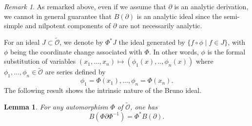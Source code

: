 \documentclass[10pt,twoside,reqno]{amsart}
\newtheorem{lemma}[thm]{Lemma}
\theoremstyle{remark}
\theoremstyle{remark}
\newtheorem{remark}[thm]{Remark}
\newcommand{\tO}{\widetilde{\mathcal{O}}}
\begin{document}
\begin{remark}\label{remark-Bnotnecanalytic}
  As remarked above, even if we assume that $\partial$ is an analytic
  derivation, we cannot in general guarantee that $B (\partial)$ is an
  analytic ideal since the semi-simple and nilpotent components of $\partial$ are not necessarily analytic.
\end{remark}
For an ideal $J \subset \tilde{\mathcal{O}}$, we denote by
  $\Phi^{\ast} J$ the ideal generated by $\{f \circ \phi \mid f \in J\}$, with
  $\phi$ being the coordinate change associated with $\Phi$. In other words, $\phi$ is the formal substitution of variables $(x_1,...,x_n) \mapsto (\phi_1(x),..,\phi_n(x))$ where $\phi_1,...,\phi_n \in \tO$ are series defined by
 $$
 \phi_1=\Phi(x_1),\ldots,\phi_n=\Phi(x_n).
 $$
The following result shows the intrinsic nature of the Bruno ideal. 
\begin{lemma}
  \label{lemma-pull-back-B} For any automorphism $\Phi$ of
  $\tilde{\mathcal{O}}$, one has
  \[ B (\Phi \partial \Phi^{- 1}) = \Phi^{\ast} B (\partial). \]
  \end{lemma}
  
\end{document}
